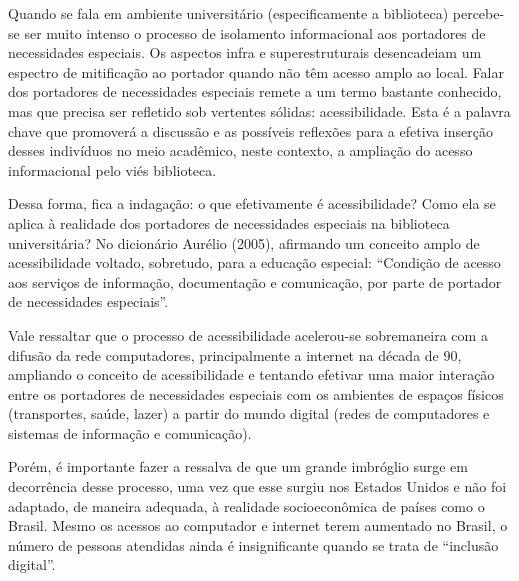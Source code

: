

	Quando se fala em ambiente universitário (especificamente a biblioteca) percebe-se ser muito intenso o processo de isolamento informacional aos portadores de necessidades especiais. Os aspectos infra e superestruturais desencadeiam um espectro de mitificação ao portador quando não têm acesso amplo ao local.
Falar dos portadores de necessidades especiais remete a um termo bastante conhecido, mas que precisa ser refletido sob vertentes sólidas: acessibilidade. Esta é a palavra chave que promoverá a discussão e as possíveis reflexões para a efetiva inserção desses indivíduos no meio acadêmico, neste contexto, a ampliação do acesso informacional pelo viés biblioteca.

	Dessa forma, fica a indagação: o que efetivamente é acessibilidade? Como ela se aplica à realidade dos portadores de necessidades especiais na biblioteca universitária? No dicionário Aurélio (2005), afirmando um conceito amplo de acessibilidade voltado, sobretudo, para a educação especial: “Condição de acesso aos serviços de informação, documentação e comunicação, por parte de portador de necessidades especiais”.

	Vale ressaltar que o processo de acessibilidade acelerou-se sobremaneira com a difusão da rede computadores, principalmente a internet na década de 90, ampliando o conceito de acessibilidade e tentando efetivar uma maior interação entre os portadores de necessidades especiais com os ambientes de espaços físicos (transportes, saúde, lazer) a partir do mundo digital (redes de computadores e sistemas de informação e comunicação).

	Porém, é importante fazer a ressalva de que um grande imbróglio surge em decorrência desse processo, uma vez que esse surgiu nos Estados Unidos e não foi adaptado, de maneira adequada, à realidade socioeconômica de países como o Brasil. Mesmo os acessos ao computador e internet terem aumentado no Brasil, o número de pessoas atendidas ainda é insignificante quando se trata de “inclusão digital”.

